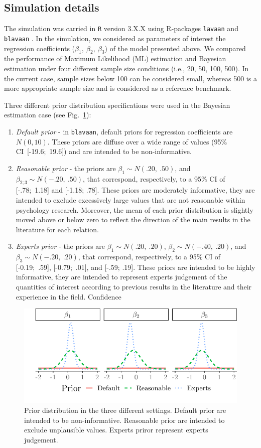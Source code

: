 \documentclass[graybox]{svmult}
\begin{document}
\subsection{Simulation details}

The simulation was carried in \texttt{R} version 3.X.X \cite{rcoreteamLanguageEnvironmentStatistical2018} using R-packages \texttt{lavaan} \cite{rosseelLavaanPackageStructural2012} and \texttt{blavaan} \cite{merkleBlavaanBayesianStructural2018}. In the simulation, we  considered as parameters of interest the regression coefficients ($\beta_1,\ \beta_2,\ \beta_3$) of the model presented above. We compared the performance of Maximum Likelihood (ML) estimation and Bayesian estimation under four different sample size conditions (i.e., 20, 50, 100, 500). In the current case, sample sizes below 100 can be considered small, whereas 500 is a more appropriate sample size and is considered as a reference benchmark.

Three different prior distribution specifications were used in the Bayesian estimation case (see Fig.~\ref{fig:prior}):
\begin{enumerate}
	\item{\textit{Default prior} -  in \texttt{blavaan}, default priors for regression coefficients are $N(0,10)$}. These priors are diffuse over a wide range of values (95\% CI\ [-19.6;\ 19.6]) and are intended to be non-informative.
	\item{\textit{Reasonable prior} - the priors are $\beta_1\sim N(.20,\ .50)$, and  $\beta_{2;3}\sim N(-.20,\ .50)$, that correspond, respectively, to a 95\% CI of  [-.78;\ 1.18] and  [-1.18; .78]. These priors are moderately informative, they are intended to exclude excessively large values that are not reasonable within psychology research. Moreover, the mean of each prior distribution is slightly moved above or below zero to reflect the direction of the main results in the literature for each relation.}
 	\item{\textit{Experts prior} - the priors are $\beta_1\sim N(.20,\ .20)$,  $\beta_{2}\sim N(-.40,\ .20)$}, and $\beta_3\sim N(-.20,\ .20)$, that correspond, respectively, to a 95\% CI of  [-0.19;\ .59], [-0.79;\ .01], and  [-.59; .19]. These priors are intended to be highly informative, they are intended to represent experts judgement of the quantities of interest according to previous results in the literature and their experience in the field. Confidence 
\end{enumerate}
\begin{figure}[b]
	\sidecaption
	\includegraphics[width = .60\textwidth]{figure/Plot_prior}
	\caption{Prior distribution in the three different settings. Default prior are intended to be non-informative. Reasonable prior  are intended to exclude unplausible values. Experts priror represent experts judgement.}
	\label{fig:prior}
\end{figure}
\end{document}
